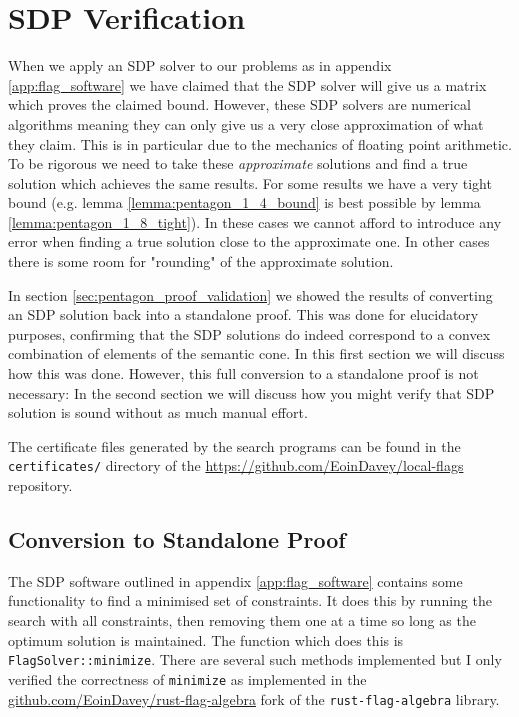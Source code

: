 \chapter{SDP Verification}
\label{app:sdp_verification}

When we apply an SDP solver to our problems as in appendix \ref{app:flag_software}
we have claimed that the SDP solver will give us a matrix which proves the claimed bound.
However, these SDP solvers are numerical algorithms meaning they can only give us a very
close approximation of what they claim. This is in particular due to the mechanics of
floating point arithmetic. To be rigorous we need to take these \textit{approximate}
solutions and find a true solution which achieves the same results.
For some results we have a very tight bound (e.g. lemma \ref{lemma:pentagon_1_4_bound}
is best possible by lemma \ref{lemma:pentagon_1_8_tight}). In these cases we cannot afford
to introduce any error when finding a true solution close to the approximate one. In
other cases there is some room for "rounding" of the approximate solution.

In section \ref{sec:pentagon_proof_validation} we showed the results of converting an
SDP solution back into a standalone proof. This was done for elucidatory purposes,
confirming that the SDP solutions do indeed correspond to a convex combination of elements
of the semantic cone. In this first section we will discuss how this was done.
However, this full conversion to a standalone proof is not necessary: In the second
section we will discuss how you might verify that SDP solution is sound without as much
manual effort.

The certificate files generated by the search programs can be found in the\\
\verb|certificates/| directory of the \url{https://github.com/EoinDavey/local-flags}
repository.

\section*{Conversion to Standalone Proof}

The SDP software outlined in appendix \ref{app:flag_software} contains some
functionality to find a minimised set of constraints. It does this by
running the search with all constraints, then removing them one at a time so long as
the optimum solution is maintained. The function which does this is
\verb|FlagSolver::minimize|. There are several such methods implemented but I
only verified the correctness of \verb|minimize| as implemented in the
\url{github.com/EoinDavey/rust-flag-algebra} fork of the \verb|rust-flag-algebra|
library.

